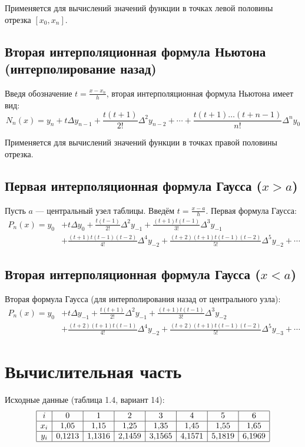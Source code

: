 Применяется для вычислений значений функции в точках левой половины отрезка $[x_0, x_n]$.

\subsection{Вторая интерполяционная формула Ньютона (интерполирование назад)}

Введя обозначение $t = \frac{x - x_n}{h}$, вторая интерполяционная формула Ньютона имеет вид:
\[
N_n(x) = y_n + t\Delta y_{n-1} + \frac{t(t+1)}{2!}\Delta^2 y_{n-2} + \cdots + \frac{t(t+1)\ldots(t+n-1)}{n!}\Delta^n y_0
\]

Применяется для вычислений значений функции в точках правой половины отрезка.

\subsection{Первая интерполяционная формула Гаусса ($x > a$)}

Пусть $a$ — центральный узел таблицы. Введём $t = \frac{x - a}{h}$. Первая формула Гаусса:
\[
\begin{aligned}
P_n(x) = y_0 &+ t\Delta y_0 + \frac{t(t-1)}{2!}\Delta^2 y_{-1} + \frac{(t+1)t(t-1)}{3!}\Delta^3 y_{-1} \\
&+ \frac{(t+1)t(t-1)(t-2)}{4!}\Delta^4 y_{-2} + \frac{(t+2)(t+1)t(t-1)(t-2)}{5!}\Delta^5 y_{-2} + \cdots
\end{aligned}
\]

\subsection{Вторая интерполяционная формула Гаусса ($x < a$)}

Вторая формула Гаусса (для интерполирования назад от центрального узла):
\[
\begin{aligned}
P_n(x) = y_0 &+ t\Delta y_{-1} + \frac{t(t+1)}{2!}\Delta^2 y_{-1} + \frac{(t+1)t(t-1)}{3!}\Delta^3 y_{-2} \\
&+ \frac{(t+2)(t+1)t(t-1)}{4!}\Delta^4 y_{-2} + \frac{(t+2)(t+1)t(t-1)(t-2)}{5!}\Delta^5 y_{-3} + \cdots
\end{aligned}
\]

\section{Вычислительная часть}

Исходные данные (таблица 1.4, вариант 14):
\[
\begin{array}{|c|c|c|c|c|c|c|c|}
\hline
i & 0 & 1 & 2 & 3 & 4 & 5 & 6 \\
\hline
x_i & 1{,}05 & 1{,}15 & 1{,}25 & 1{,}35 & 1{,}45 & 1{,}55 & 1{,}65 \\
\hline
y_i & 0{,}1213 & 1{,}1316 & 2{,}1459 & 3{,}1565 & 4{,}1571 & 5{,}1819 & 6{,}1969 \\
\hline
\end{array}
\]

